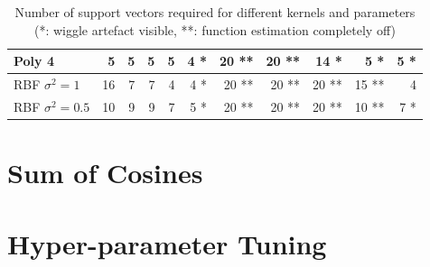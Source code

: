 \documentclass[11pt, a4paper]{article}
\begin{document}
\begin{table}[H]
\begin{tabular}{l|r|r|r|r|r|r|r|r|r|r|}
\multicolumn{1}{|l|}{Poly 4}             & 5                          & 5                         & 5                         & 5                        & 4 *                      & 20 **                     & 20 **                    & 14 *                   & 5 *                     & 5 *                      \\ \hline
\multicolumn{1}{|l|}{RBF $\sigma^2=1$}   & 16                         & 7                         & 7                         & 4                        & 4 *                      & 20 **                     & 20 **                    & 20 **                  & 15 **                   & 4                        \\ \hline
\multicolumn{1}{|l|}{RBF $\sigma^2=0.5$} & 10                         & 9                         & 9                         & 7                        & 5 *                      & 20 **                     & 20 **                    & 20 **                  & 10 **                   & 7 *                      \\ \hline
  \end{tabular}
  \caption{Number of support vectors required for different kernels and parameters (*: wiggle artefact visible, **: function estimation completely off)}
  \label{table:dataset_lin}
\end{table}


\section{Sum of Cosines}

\section{Hyper-parameter Tuning}


\end{document}
